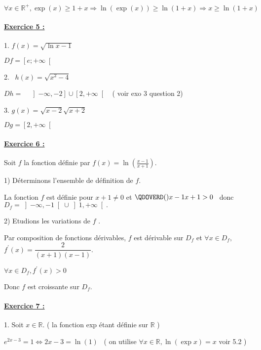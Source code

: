 \documentclass{article}
\begin{document}
$\forall x\in 
\mathbb{R}
^{+},\exp (x)\geq 1+x\Rightarrow \ln (\exp (x))\geq \ln (1+x)\Rightarrow
x\geq \ln (1+x)$

\paragraph{\protect\underline{Exercice 5 :}}

1. $f(x)=\sqrt{\ln x-1}$ \ \ 

$Df=\left[ e;+\infty \right[ $

2. \ $h(x)=\sqrt{x^{2}-4}$ \ \ 

$Dh=$\ \ $\left] -\infty ,-2\right] \cup \left[ 2,+\infty \right[ $ \ ( voir
exo 3 question 2)

3. $g(x)=\sqrt{x-2}\sqrt{x+2}$ \ \ 

$Dg=\left[ 2,+\infty \right[ $

\paragraph{\protect\underline{Exercice 6 :}}

Soit $f$ la fonction d\'{e}finie par $f(x)=\ln (\frac{x-1}{x+1}).$

1) D\'{e}terminons l'ensemble de d\'{e}finition de $f$.

La fonction $f$ est d\'{e}finie pour $x+1\neq 0$ et $\QDOVERD( )
{x-1}{x+1}>0 $ \ donc $D_{f}=\left] -\infty ,-1\right[ \cup \left] 1,+\infty %
\right[ .$

2) Etudions les variations de $f$ .

Par composition de fonctions d\'{e}rivables, $f$ est d\'{e}rivable sur $%
D_{f} $ et $\forall x\in D_{f},$ $f^{\prime }(x)=\dfrac{2}{(x+1)(x-1)}.$

$\forall x\in D_{f},f^{\prime }(x)>0$

Donc $f$ est croissante sur $D_{f}.$

\paragraph{\protect\underline{Exercice 7 :}\ \ \ \ \ \ \ }

1. Soit $x\in 
\mathbb{R}
.$ ( la fonction exp \'{e}tant d\'{e}finie sur $%
\mathbb{R}
$ )

$e^{2x-3}=1\Leftrightarrow 2x-3=\ln (1)$ \ ( on utilise $\forall x\in 
\mathbb{R}
,\ln (\exp x)=x$ voir 5.2 )
\end{document}
